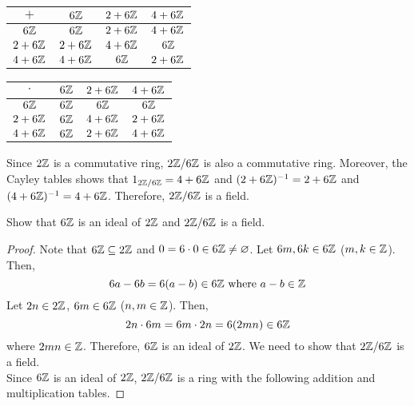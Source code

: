 \begin{solution}
\begin{enumerate}
\begin{center}
\begin{multicols}{2}
                    \begin{tabular}{c | c c c}
                        $+$ & $6\mathbb{Z}$ & $2 + 6\mathbb{Z}$ & $4 + 6\mathbb{Z}$ \\
                        \hline
                        $6\mathbb{Z}$ & $6\mathbb{Z}$ & $2 + 6\mathbb{Z}$ & $4 + 6\mathbb{Z}$ \\
                        $2 + 6\mathbb{Z}$ & $2 + 6\mathbb{Z}$ & $4 + 6\mathbb{Z}$ & $6\mathbb{Z}$ \\
                        $4 + 6\mathbb{Z}$ & $4 + 6\mathbb{Z}$ & $6\mathbb{Z}$ & $2 + 6\mathbb{Z}$ \\
                    \end{tabular}
                    
                    \columnbreak
                    \hspace{2em}
                    \begin{tabular}{c | c c c}
                        $\cdot$ & $6\mathbb{Z}$ & $2 + 6\mathbb{Z}$ & $4 + 6\mathbb{Z}$ \\
                        \hline
                        $6\mathbb{Z}$ & $6\mathbb{Z}$ & $6\mathbb{Z}$ & $6\mathbb{Z}$ \\
                        $2 + 6\mathbb{Z}$ & $6\mathbb{Z}$ & $4 + 6\mathbb{Z}$ & $2 + 6\mathbb{Z}$ \\
                        $4 + 6\mathbb{Z}$ & $6\mathbb{Z}$ & $2 + 6\mathbb{Z}$ & $4 + 6\mathbb{Z}$ \\
                    \end{tabular}
                \end{multicols}
        \end{center}
        
        Since $2\mathbb{Z}$ is a commutative ring, $2\mathbb{Z} / 6\mathbb{Z}$ is also a commutative ring. Moreover, the Cayley tables shows that $1_{2\mathbb{Z} / 6\mathbb{Z}} = 4 + 6\mathbb{Z}$ and $(2 + 6\mathbb{Z})^{-1} = 2 + 6\mathbb{Z}$ and $(4 + 6\mathbb{Z})^{-1} = 4 + 6\mathbb{Z}$. Therefore, $2\mathbb{Z} / 6\mathbb{Z}$ is a field. \qedsymbol
    \end{enumerate}
\end{solution}

\begin{exercise}
    Show that $6\mathbb{Z}$ is an ideal of $2\mathbb{Z}$ and $2\mathbb{Z} / 6\mathbb{Z}$ is a field.
\end{exercise}

\begin{proof}
    Note that $6\mathbb{Z} \subseteq 2\mathbb{Z}$ and $0 = 6 \cdot 0 \in 6\mathbb{Z} \neq \varnothing$. Let $6m, 6k \in 6\mathbb{Z}$ ($m, k \in \mathbb{Z}$). Then,
    \[ 6a - 6b = 6(a - b) \in 6\mathbb{Z} \text{ where } a- b \in \mathbb{Z} \]
    Let $2n \in 2\mathbb{Z}$, $6m \in 6\mathbb{Z}$ ($n, m \in \mathbb{Z}$). Then,
    \[2n \cdot 6m = 6m \cdot 2n = 6(2mn) \in 6\mathbb{Z} \]
    where $2mn \in \mathbb{Z}$. Therefore, $6\mathbb{Z}$ is an ideal of $2\mathbb{Z}$. We need to show that $2\mathbb{Z} / 6\mathbb{Z}$ is a field. \\
    
    Since $6\mathbb{Z}$ is an ideal of $2\mathbb{Z}$, $2\mathbb{Z} / 6\mathbb{Z}$ is a ring with the following addition and multiplication tables.
\end{proof}

